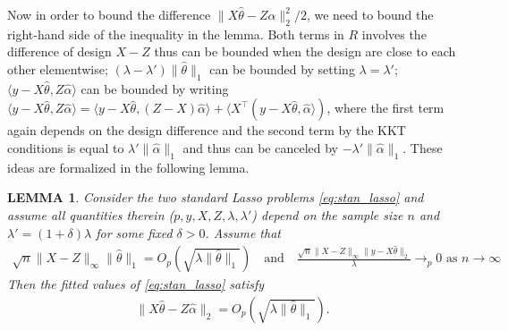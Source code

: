 \documentclass[a4paper]{article}
\newtheorem{lemma}{LEMMA}
\begin{document}
Now in order to bound the difference $\|X\hat{\theta} - Z\hat{\alpha}\|_2^2/2$, we need to bound the right-hand side of the inequality in the lemma. Both terms in $R$ involves the difference of design $X-Z$ thus can be bounded when the design are close to each other elementwise; $(\lambda - \lambda')\|\hat{\theta}\|_1$ can be bounded by setting $\lambda = \lambda'$; $\langle y-X\hat{\theta}, Z\hat{\alpha}\rangle$ can be bounded by writing $\langle y-X\hat{\theta}, Z\hat{\alpha}\rangle = \langle y-X\hat{\theta}, (Z-X)\hat{\alpha} \rangle + \langle X^\top(y-X\hat{\theta}, \hat{\alpha}\rangle)$, where the first term again depends on the design difference and the second term by the KKT conditions is equal to $\lambda'\|\hat{\alpha}\|_1$ and thus can be canceled by $-\lambda'\|\hat{\alpha}\|_1$. These ideas are formalized in the following lemma.

\begin{lemma}
Consider the two standard Lasso problems \eqref{eq:stan_lasso} and assume all quantities therein ($p, y, X,Z,\lambda,\lambda'$) depend on the sample size $n$ and $\lambda' = (1+\delta)\lambda$ for some fixed $\delta >0$. Assume that 
\begin{align}
\sqrt{n}\|X-Z\|_\infty\|\hat{\theta}\|_1 = O_p(\sqrt{\lambda\|\hat{\theta}\|_1}) \quad \text{and} \quad \frac{\sqrt{n}\|X-Z\|_\infty\|y-X\hat{\theta}\|_2}{\lambda} \rightarrow_p 0 \text{ as } n \rightarrow \infty
\label{eq:stan_lasso_cond}
\end{align}
Then the fitted values of \eqref{eq:stan_lasso} satisfy 
\begin{align}
\|X\hat{\theta} - Z\hat{\alpha}\|_2 = O_p(\sqrt{\lambda\|\hat{\theta}\|_1}).
\end{align}
\label{lemma:lemma_2}
\end{lemma}
\end{document}
